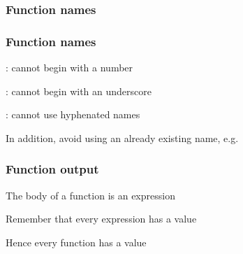 \documentclass[12pt]{beamer}\usepackage[]{graphicx}\usepackage[]{color}
\begin{document}

\begin{frame}[fragile]
\frametitle{Function names}

\bi
  \item {}
  \item {}
  \item {}
  \item {}
  \item {}
\ei
\eb

\end{frame}


\begin{frame}[fragile]
\frametitle{Function names}

\bi
  \item {}: cannot begin with a number
  \item {}: cannot begin with an underscore
  \item {}: cannot use hyphenated names
\ei
\eb

\bigskip
In addition, avoid using an already existing name, e.g. 

\end{frame}


\begin{frame}
\begin{center}
\Huge{}
\end{center}
\end{frame}


\begin{frame}
\frametitle{Function output}

\bbi
  \item The body of a function is an expression
  \item Remember that every expression has a value
  \item Hence every function has a value
\ei

\end{frame}

\end{document}
